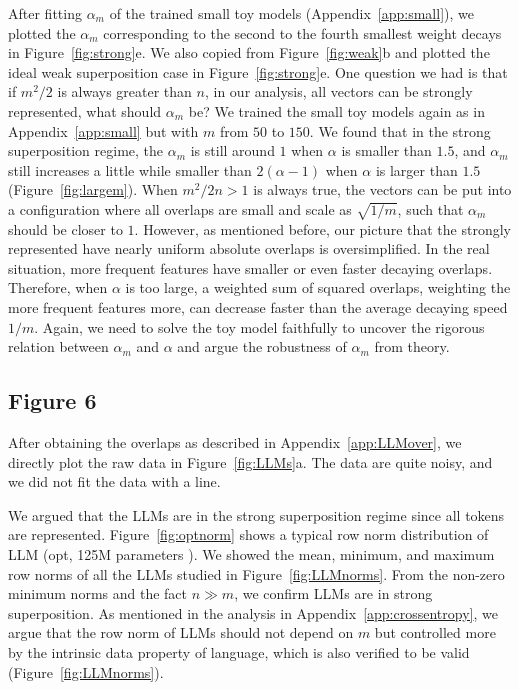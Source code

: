 \documentclass{article}
\begin{document}
After fitting $\alpha_m$ of the trained small toy models (Appendix~\ref{app:small}), we plotted the $\alpha_m$ corresponding to the second to the fourth smallest weight decays in Figure~\ref{fig:strong}e. We also copied from Figure~\ref{fig:weak}b and plotted the ideal weak superposition case in Figure~\ref{fig:strong}e. One question we had is that if $m^2/2$ is always greater than $n$, in our analysis, all vectors can be strongly represented, what should $\alpha_m$ be? We trained the small toy models again as in Appendix~\ref{app:small} but with $m$ from $50$ to $150$. We found that in the strong superposition regime, the $\alpha_m$ is still around $1$ when $\alpha$ is smaller than $1.5$, and $\alpha_m$ still increases a little while smaller than $2(\alpha -1)$ when $\alpha$ is larger than $1.5$ (Figure~\ref{fig:largem}). When $m^2/2n >1$ is always true, the vectors can be put into a configuration where all overlaps are small and scale as $\sqrt{1/m}$, such that $\alpha_m$ should be closer to $1$. However, as mentioned before, our picture that the strongly represented have nearly uniform absolute overlaps is oversimplified. In the real situation, more frequent features have smaller or even faster decaying overlaps. Therefore, when $\alpha$ is too large, a weighted sum of squared overlaps, weighting the more frequent features more, can decrease faster than the average decaying speed $1/m$. Again, we need to solve the toy model faithfully to uncover the rigorous relation between $\alpha_m$ and $\alpha$ and argue the robustness of $\alpha_m$ from theory.

\subsection{Figure 6}\label{app:fig8}

After obtaining the overlaps as described in Appendix~\ref{app:LLMover}, we directly plot the raw data in Figure~\ref{fig:LLMs}a. The data are quite noisy, and we did not fit the data with a line. 

We argued that the LLMs are in the strong superposition regime since all tokens are represented. Figure~\ref{fig:optnorm} shows a typical row norm distribution of LLM (opt, 125M parameters \cite{zhang2022opt}). We showed the mean, minimum, and maximum row norms of all the LLMs studied in Figure~\ref{fig:LLMnorms}. From the non-zero minimum norms and the fact $n \gg m$, we confirm LLMs are in strong superposition. As mentioned in the analysis in Appendix~\ref{app:crossentropy}, we argue that the row norm of LLMs should not depend on $m$ but controlled more by the intrinsic data property of language, which is also verified to be valid (Figure~\ref{fig:LLMnorms}).
\end{document}
